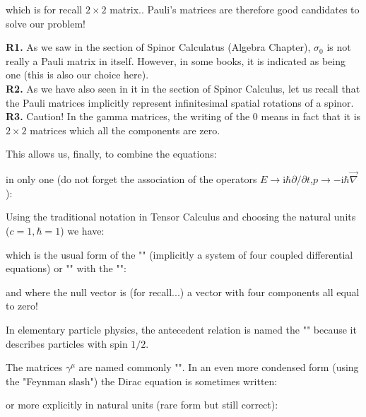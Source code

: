	which is for recall $2\times 2$ matrix.. Pauli's matrices are therefore good candidates to solve our problem!
	\begin{tcolorbox}[title=Remarks,colframe=black,arc=10pt]
	\textbf{R1.} As we saw in the section of Spinor Calculatus (Algebra Chapter), $\sigma_0$ is not really a Pauli matrix in itself. However, in some books, it is indicated as being one (this is also our choice here).\\
	
	\textbf{R2.} As we have also seen in it in the section of Spinor Calculus, let us recall that the Pauli matrices implicitly represent infinitesimal spatial rotations of a spinor.\\
	
	\textbf{R3.} Caution! In the gamma matrices, the writing of the $0$ means in fact that it is $2\times 2$ matrices  which all the components are zero.
	\end{tcolorbox}	
	This allows us, finally, to combine the equations:
	
	in only one (do not forget the association of the operators $E\rightarrow \mathrm{i}\hbar\partial/\partial t$,$p\rightarrow -\mathrm{i}\hbar\vec{\nabla}$):
	
	Using the traditional notation in Tensor Calculus and choosing the natural units ($c=1,\hbar=1$) we have:
	
	which is the usual form of the "" (implicitly a system of four coupled differential equations) or "" with the "":
	
	and where the null vector is (for recall...) a vector with four components all equal to zero!
	\begin{tcolorbox}[title=Remark,colframe=black,arc=10pt]
	In elementary particle physics, the antecedent relation is named the "" because it describes particles with spin $1/2$.
	\end{tcolorbox}
	The matrices $\gamma^\mu$ are named commonly "". In an even more condensed form (using the "Feynman slash") the Dirac equation is sometimes written:
	
	or more explicitly in natural units (rare form but still correct):
	
